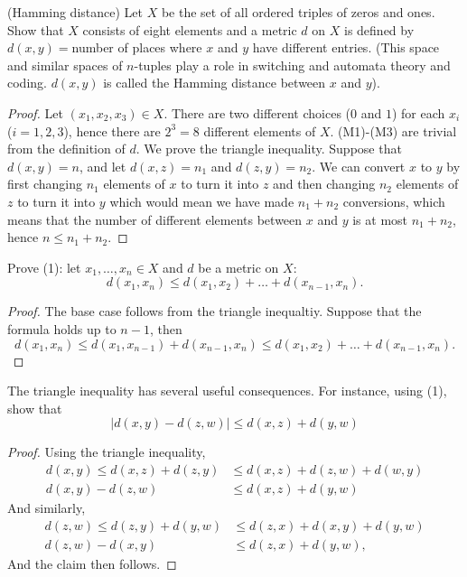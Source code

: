 \documentclass[12pt]{article}
\newenvironment{exercise}[2][Exercise]{\begin{trivlist}
\item[\hskip \labelsep {\bfseries #1}\hskip \labelsep {\bfseries #2.}]}{\end{trivlist}}
\begin{document}
\begin{exercise}{1.1.10}
    (Hamming distance) Let $X$ be the set of all ordered triples of zeros and ones. Show that $X$ consists of eight elements and a metric $d$ on $X$ is defined by $d(x, y)=$number of places where $x$ and $y$ have different entries. (This space and similar spaces of $n$-tuples play a role in switching and automata theory and coding. $d(x, y)$ is called the Hamming distance between $x$ and $y$).
\end{exercise}
\begin{proof}
    Let $(x_1, x_2, x_3) \in X$. There are two different choices ($0$ and $1$) for each $x_i$ ($i = 1, 2, 3$), hence there are $2^3 = 8$ different elements of $X$. (M1)-(M3) are trivial from the definition of $d$. We prove the triangle inequality. Suppose that $d(x, y) = n$, and let $d(x, z) = n_1$ and $d(z, y) = n_2$. We can convert $x$ to $y$ by first changing $n_1$ elements of $x$ to turn it into $z$ and then changing $n_2$ elements of $z$ to turn it into $y$ which would mean we have made $n_1 + n_2$ conversions, which means that the number of different elements between $x$ and $y$ is at most $n_1 + n_2$, hence $n \leq n_1 + n_2$.
\end{proof}

\begin{exercise}{1.1.11}
    Prove (1): let $x_1, \ldots, x_n \in X$ and $d$ be a metric on $X$:
    \[ d(x_1, x_n) \leq d(x_1, x_2) + \ldots + d(x_{n-1}, x_n). \]
\end{exercise}
\begin{proof}
    The base case follows from the triangle inequaltiy. Suppose that the formula holds up to $n-1$, then
    \[ d(x_1, x_n) \leq d(x_1, x_{n-1}) + d(x_{n-1}, x_n) \leq d(x_1, x_2) + \ldots + d(x_{n-1}, x_n). \]
\end{proof}

\begin{exercise}{1.1.12}
    The triangle inequality has several useful consequences. For instance, using (1), show that
    \[ |d(x, y) - d(z, w)| \leq d(x, z) + d(y, w) \]
\end{exercise}
\begin{proof}
    Using the triangle inequality,
    \begin{align*}
        d(x, y) \leq d(x, z) + d(z, y) &\leq d(x, z) + d(z, w) + d(w, y) \\
        d(x, y) - d(z, w) &\leq d(x, z) + d(y, w)
    \end{align*}
    And similarly,
    \begin{align*}
        d(z, w) \leq d(z, y) + d(y, w) &\leq d(z, x) + d(x, y) + d(y, w)  \\
        d(z, w) - d(x, y) &\leq d(z, x) + d(y, w),
    \end{align*}
    And the claim then follows.
\end{proof}
\end{document}
